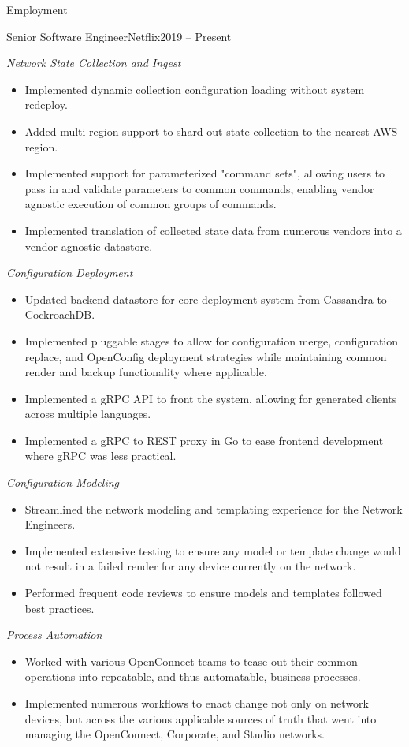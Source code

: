 \documentclass[calibri]{mcdowellcv}
\begin{document}
	\makeheader
	
	\begin{cvsection}{Employment}
		\begin{cvsubsection}{Senior Software Engineer}{Netflix}{2019 -- Present}	

			\textit{Network State Collection and Ingest}
			\begin{itemize}
				\item Implemented dynamic collection configuration loading without system redeploy.
				\item Added multi-region support to shard out state collection to the nearest AWS region.
				\item Implemented support for parameterized "command sets", allowing users to pass in and validate parameters to common commands, enabling vendor agnostic execution of common groups of commands.
				\item Implemented translation of collected state data from numerous vendors into a vendor agnostic datastore.
			\end{itemize}
			\bigskip
			\textit{Configuration Deployment}
			\begin{itemize}
				\item Updated backend datastore for core deployment system from Cassandra to CockroachDB.
				\item Implemented pluggable stages to allow for configuration merge, configuration replace, and OpenConfig deployment strategies while maintaining common render and backup functionality where applicable.
				\item Implemented a gRPC API to front the system, allowing for generated clients across multiple languages.
				\item Implemented a gRPC to REST proxy in Go to ease frontend development where gRPC was less practical.
			\end{itemize}
			\bigskip
			\textit{Configuration Modeling}
			\begin{itemize}
				\item Streamlined the network modeling and templating experience for the Network Engineers.
				\item Implemented extensive testing to ensure any model or template change would not result in a failed render for any device currently on the network.
				\item Performed frequent code reviews to ensure models and templates followed best practices.
			\end{itemize}
			\bigskip
			\textit{Process Automation}
			\begin{itemize}
				\item Worked with various OpenConnect teams to tease out their common operations into repeatable, and thus automatable, business processes.
				\item Implemented numerous workflows to enact change not only on network devices, but across the various applicable sources of truth that went into managing the OpenConnect, Corporate, and Studio networks.
			\end{itemize}
		\end{cvsubsection}
		

\end{cvsection}
\end{document}
